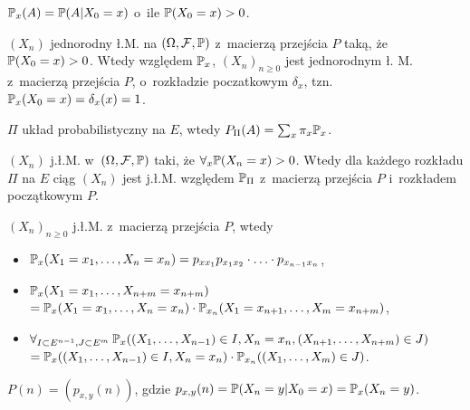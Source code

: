 



	\begin{definition}
		$\P_x(A) = \P(A | X_0 = x)$ o~ile $\P(X_0 = x) > 0$.
	\end{definition}
	
	\begin{fact}
		$(X_n)$ jednorodny ł.M. na $(\Omega, \F, \P)$ 
		z~macierzą przejścia $P$ taką, że $\P(X_0 = x)>0$.
		Wtedy względem $\P_x$, $(X_n)_{n \geq 0}$ jest jednorodnym
		ł. M. z~macierzą przejścia $P$, o~rozkładzie poczatkowym 
		$\delta_x$, tzn. $\P_x(X_0 = x) = \delta_x(x) = 1$.
	\end{fact}
	
	\begin{definition}
		$\Pi$ układ probabilistyczny na $E$, wtedy 
		$P_\Pi(A) = \sum_x \pi_x \P_x$.
	\end{definition}
	
	\begin{fact}
		$(X_n)$ j.ł.M. w~$(\Omega, \F, \P)$ taki, że 
		$\forall_x \P(X_n = x) > 0$.
		Wtedy dla każdego rozkładu $\Pi$ na $E$ ciąg $(X_n)$ jest 
		j.ł.M. względem $\P_\Pi$ z~macierzą przejścia $P$
		i~rozkładem początkowym $P$.
	\end{fact}
	
	\begin{fact}
		$(X_n)_{n \geq 0}$ j.ł.M. z~macierzą przejścia $P$, wtedy
		\begin{itemize}
			\item $\P_x(X_1 = x_1, \ldots, X_n = x_n)
			= p_{x x_1} p_{x_1 x_2} \cdot \ldots\cdot p_{x_{n-1}x_n}$,
			\item $\P_x (X_1 = x_1, \ldots, X_{n+m} = x_{n+m})$
			\\${= \P_x (X_1 = x_1, \ldots, X_n = x_n)
			\cdot \P_{x_n}(X_1 = x_{n+1}, \ldots, X_m = x_{n+m})}$,
			\item $\forall_{I \subset E^{n-1}, J \subset E^m} \:
			\P_x( (X_1, \ldots, X_{n-1}) \in I, 
				X_n = x_n, 
				(X_{n+1}, \ldots, X_{n+m}) \in J )$\\
			${= \P_x( (X_1, \ldots, X_{n-1}) \in I, X_n = x_n)
				\cdot \P_{x_n}( (X_1, \ldots, X_m) \in J)}$.
		\end{itemize}

	\end{fact}
	
	\begin{definition}
		$P(n) = (p_{x,y}(n))$, 
		gdzie $p_{x,y}(n) = \P(X_n = y | X_0 = x) = \P_x(X_n = y)$.
	\end{definition}
	

